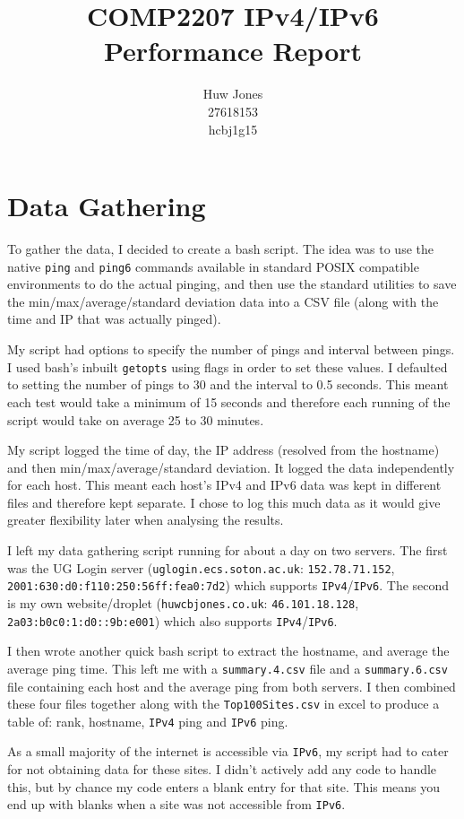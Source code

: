 \documentclass[a4paper]{article}
\author{Huw Jones\\27618153\\hcbj1g15}
\title{COMP2207 IPv4/IPv6 Performance Report}
\def \IPF {\texttt{IPv4}}
\def \IPS {\texttt{IPv6}}
\begin{document}
\maketitle
\newpage

\section{Data Gathering}
To gather the data, I decided to create a bash script.
The idea was to use the native \texttt{ping} and \texttt{ping6} commands available in standard POSIX compatible environments to do the actual pinging,
and then use the standard utilities to save the min/max/average/standard deviation data into a CSV file (along with the time and IP that was actually pinged).

My script had options to specify the number of pings and interval between pings.
I used bash's inbuilt \texttt{getopts} using flags in order to set these values.
I defaulted to setting the number of pings to 30 and the interval to 0.5 seconds.
This meant each test would take a minimum of 15 seconds and therefore each running of the script would take on average 25 to 30 minutes.

My script logged the time of day, the IP address (resolved from the hostname) and then min/max/average/standard deviation.
It logged the data independently for each host.
This meant each host's IPv4 and IPv6 data was kept in different files and therefore kept separate.
I chose to log this much data as it would give greater flexibility later when analysing the results.

I left my data gathering script running for about a day on two servers.
The first was the UG Login server (\texttt{uglogin.ecs.soton.ac.uk}: \texttt{152.78.71.152}, \texttt{2001:630:d0:f110:250:56ff:fea0:7d2}) which supports \IPF/\IPS.
The second is my own website/droplet (\texttt{huwcbjones.co.uk}: \texttt{46.101.18.128}, \texttt{2a03:b0c0:1:d0::9b:e001}) which also supports \IPF/\IPS.

I then wrote another quick bash script to extract the hostname, and average the average ping time.
This left me with a \texttt{summary.4.csv} file and a \texttt{summary.6.csv} file containing each host and the average ping from both servers.
I then combined these four files together along with the \texttt{Top100Sites.csv} in excel to produce a table of: rank, hostname, {\IPF} ping and {\IPS} ping.

As a small majority of the internet is accessible via \IPS, my script had to cater for not obtaining data for these sites.
I didn't actively add any code to handle this, but by chance my code enters a blank entry for that site.
This means you end up with blanks when a site was not accessible from \IPS.
\end{document}
